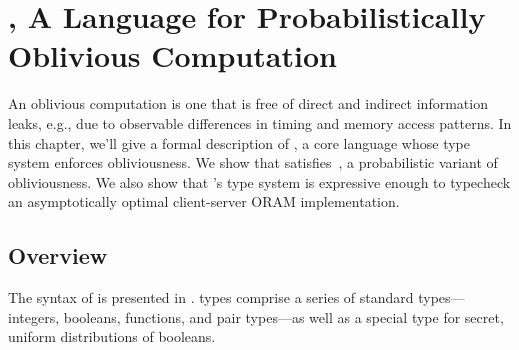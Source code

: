 \chapter{\obliv, A Language for Probabilistically Oblivious Computation}
\label{ch:lam-obliv}

An oblivious computation is one that is free of direct and indirect information leaks, e.g., due to observable differences
in timing and memory access patterns. In this chapter, we'll give a formal description of \obliv, a core language whose
type system enforces obliviousness. We show that \obliv satisfies~, a probabilistic variant of obliviousness.
We also show that \obliv's type system is expressive enough to typecheck an asymptotically optimal client-server ORAM implementation.

\section{Overview}
\label{sec:lam-obliv-overview}

The syntax of \obliv is presented in . \obliv types comprise a
series of standard types---integers, booleans, functions, and pair types---as well as
a special type for secret, uniform distributions of booleans.


